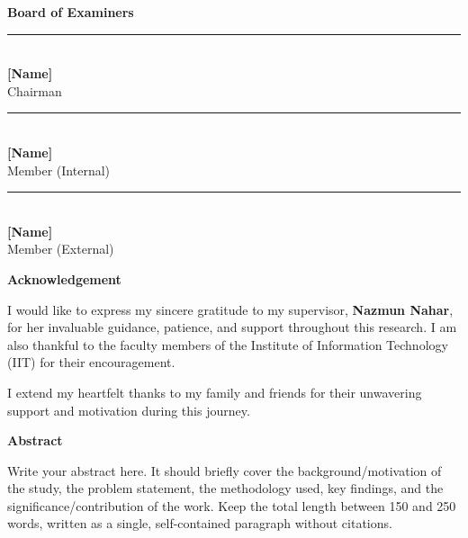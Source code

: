 \documentclass[12pt,a4paper]{report}
\begin{document}
\vspace{1cm}
\noindent\textbf{Board of Examiners}

\vspace{2cm}
\noindent
\rule{6cm}{0.4pt}\\
\textbf{[Name]}\\
Chairman\\
[Designation, Department]

\vspace{2cm}
\noindent
\rule{6cm}{0.4pt}\\
\textbf{[Name]}\\
Member (Internal)\\
[Designation, Department]

\vspace{2cm}
\noindent
\rule{6cm}{0.4pt}\\
\textbf{[Name]}\\
Member (External)\\
[Designation, Department]

\newpage
{}
{}
\thispagestyle{empty}
\begin{center}
    \Large\textbf{Acknowledgement}
\end{center}
\vspace{1cm}

\noindent I would like to express my sincere gratitude to my supervisor,
\textbf{Nazmun Nahar}, for her invaluable guidance, patience, and support
throughout this research. I am also thankful to the faculty members of the
Institute of Information Technology (IIT) for their encouragement.

I extend my heartfelt thanks to my family and friends for their unwavering support
and motivation during this journey.

\newpage
{}
{}
\thispagestyle{empty}
\begin{center}
    \Large\textbf{Abstract}
\end{center}

\noindent
Write your abstract here. It should briefly cover the background/motivation of the
study, the problem statement, the methodology used, key findings, and the
significance/contribution of the work. Keep the total length between 150 and 250
words, written as a single, self-contained paragraph without citations.
\end{document}
